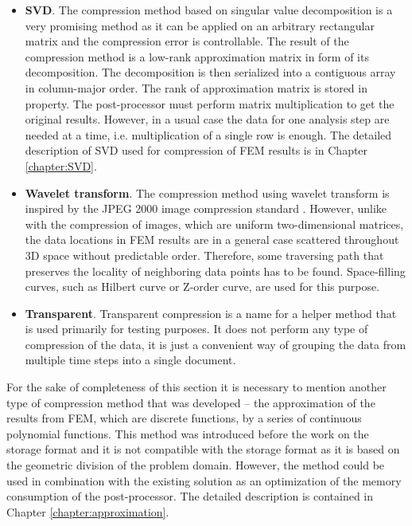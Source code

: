 \begin{itemize}
    
    \item \textbf{SVD}. The compression method based on singular value decomposition is a very promising method as it can be applied on an arbitrary rectangular matrix and the compression error is controllable. The result of the compression method is a low-rank approximation matrix in form of its decomposition. The decomposition is then serialized into a contiguous array in column-major order. The rank of approximation matrix is stored in  property. The post-processor must perform matrix multiplication to get the original results. However, in a usual case the data for one analysis step are needed at a time, i.e. multiplication of a single row is enough. The detailed description of SVD used for compression of FEM results is in Chapter \ref{chapter:SVD}.

    \item \textbf{Wavelet transform}. The compression method using wavelet transform is inspired by the JPEG 2000 image compression standard \cite{Lui2001}. However, unlike with the compression of images, which are uniform two-dimensional matrices, the data locations in FEM results are in a general case scattered throughout 3D space without predictable order. Therefore, some traversing path that preserves the locality of neighboring data points has to be found. Space-filling curves, such as Hilbert curve or Z-order curve, are used for this purpose.
    
    \item \textbf{Transparent}. Transparent compression is a name for a helper method that is used primarily for testing purposes. It does not perform any type of compression of the data, it is just a convenient way of grouping the data from multiple time steps into a single document.

\end{itemize}

For the sake of completeness of this section it is necessary to mention another type of compression method that was developed -- the approximation of the results from FEM, which are discrete functions, by a series of continuous polynomial functions. This method was introduced before the work on the storage format and it is not compatible with the storage format as it is based on the geometric division of the problem domain. However, the method could be used in combination with the existing solution as an optimization of the memory consumption of the post-processor. The detailed description is contained in Chapter \ref{chapter:approximation}.



